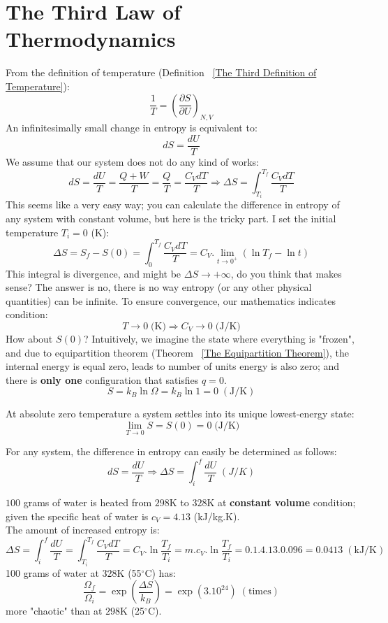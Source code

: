 \documentclass[~/PhyAI/phyai.tex]{subfiles}
\begin{document}
\section{The Third Law of Thermodynamics}
From the definition of temperature (Definition ~\ref{The Third Definition of Temperature}):
$$ \frac{1 }{T}=\left(\frac{\partial S }{\partial U}\right)_{N,V} $$
An infinitesimally small change in entropy is equivalent to:
$$ dS=\frac{dU }{T} $$
We assume that our system does not do any kind of works:
$$ dS=\frac{dU }{T}=\frac{Q+W }{T}=\frac{Q }{T}=\frac{C_{V}dT}{T}\Rightarrow \Delta S=\int_{T_{i} }^{T_{f}}\frac{C_{V}dT }{T}  $$
This seems like a very easy way; you can calculate the difference in entropy of any system with constant volume, but here is the tricky part. I set the initial temperature $T_{i}=0$ (K):
$$ \Delta S=S_{f}-S(0)=\int_{0 }^{T_{f}}\frac{C_{V}dT }{T}=C_{V}.\lim_{t\to 0^+}(\ln{T_{f}}-\ln{t})  $$
This integral is divergence, and might be $\Delta S\to+\infty$, do you think that makes sense? The answer is no, there is no way entropy (or any other physical quantities) can be infinite. To ensure convergence, our mathematics indicates condition:
$$ T\to 0\;\text{(K)}\Rightarrow C_{V}\to 0\;\text{(J/K)} $$
How about $S(0)$? Intuitively, we imagine the state where everything is "frozen", and due to equipartition theorem (Theorem ~\ref{The Equipartition Theorem}), the internal energy is equal zero, leads to number of units energy is also zero; and there is \textbf{only one} configuration that satisfies $q=0$.
$$ S=k_{B}\ln\Omega=k_{B}\ln{1}=0\;(\text{J/K}) $$
\begin{theorem}
	\label{The Third Law of Thermodynamics}
	At absolute zero temperature a system settles into its unique lowest-energy state:
	$$ \lim_{T\to 0}S=S(0)=0\;\text{(J/K)} $$
\end{theorem}
\begin{theorem}
	For any system, the difference in entropy can easily be determined as follows:
	\label{The Macroscopic View of Entropy}
	$$    dS=\frac{dU }{T}\Rightarrow\Delta S=\int_{i}^{f}\frac{dU }{T}\;(J/K)$$
\end{theorem}
\begin{exmp} $100$ grams of water is heated from $298$K to $328$K at \textbf{constant volume} condition; given the specific heat of water is $c_{V}=4.13$ (kJ/kg.K).
	\\ The amount of increased entropy is:
	$$ \Delta S=\int_{i }^{f}\frac{dU }{T}=\int_{T_{i} }^{T_{f}}\frac{C_{V}dT}{T}= C_{V}.\ln{\frac{T_{f} }{T_{i}}}=m.c_{V}.\ln{\frac{T_{f} }{T_{i}}}=0.1.4.13.0.096=0.0413\;(\text{kJ/K}) $$
	100 grams of water at $328$K (55$^{\circ}$C) has:
	$$ \frac{\Omega_{f} }{\Omega_{i}}= \exp \left(\frac{\Delta S }{k_{B}}\right)= \exp{(3.10^{24})}\;(\text{times})$$
	more "chaotic" than at $298$K (25$^{\circ}$C).
\end{exmp}
\end{document}
